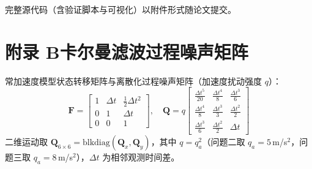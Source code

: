 \documentclass[a4paper, 12pt]{ctexart}
\begin{document}
\medskip
\noindent 完整源代码（含验证脚本与可视化）以附件形式随论文提交。

\section{\texorpdfstring{附录 B\quad 卡尔曼滤波过程噪声矩阵}{附录 B 卡尔曼滤波过程噪声矩阵}}
\noindent 常加速度模型状态转移矩阵与离散化过程噪声矩阵（加速度扰动强度 $q$）：
\begin{equation}
\mathbf{F} = \begin{bmatrix} 1 & \Delta t & \frac{1}{2}\Delta t^2 \\ 0 & 1 & \Delta t \\ 0 & 0 & 1 \end{bmatrix}, \quad
\mathbf{Q} = q \begin{bmatrix} \frac{\Delta t^5}{20} & \frac{\Delta t^4}{8} & \frac{\Delta t^3}{6} \\ \frac{\Delta t^4}{8} & \frac{\Delta t^3}{3} & \frac{\Delta t^2}{2} \\ \frac{\Delta t^3}{6} & \frac{\Delta t^2}{2} & \Delta t \end{bmatrix}
\end{equation}
二维运动取 $\mathbf{Q}_{6\times6} = \text{blkdiag}(\mathbf{Q}_x, \mathbf{Q}_y)$，其中 $q = q_a^2$（问题二取 $q_a=5$\,m/s$^2$，问题三取 $q_a=8$\,m/s$^2$），$\Delta t$ 为相邻观测时间差。
\end{document}
